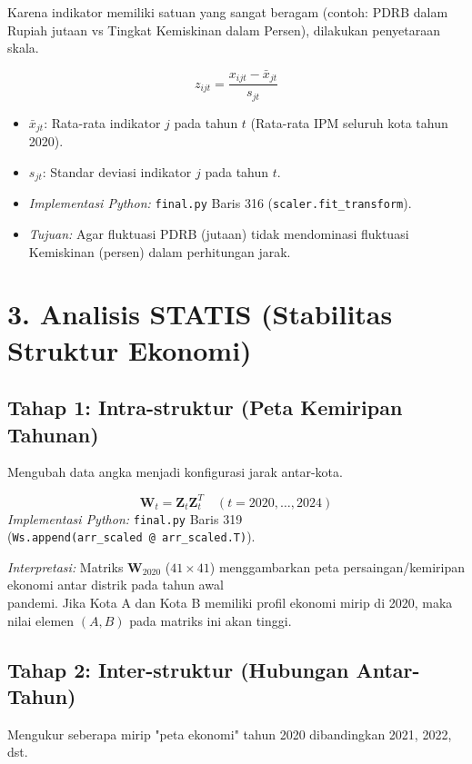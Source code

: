 Karena indikator memiliki satuan yang sangat beragam (contoh: PDRB dalam Rupiah jutaan vs Tingkat Kemiskinan dalam Persen), dilakukan penyetaraan skala.

\begin{equation}
    z_{ijt} = \frac{x_{ijt} - \bar{x}_{jt}}{s_{jt}}
\end{equation}

\begin{itemize}
    \item $\bar{x}_{jt}$: Rata-rata indikator $j$ pada tahun $t$ (Rata-rata IPM seluruh kota tahun 2020).
    \item $s_{jt}$: Standar deviasi indikator $j$ pada tahun $t$.
    \item \textit{Implementasi Python:} \texttt{final.py} Baris 316 (\texttt{scaler.fit\_transform}).
    \item \textit{Tujuan:} Agar fluktuasi PDRB (jutaan) tidak mendominasi fluktuasi Kemiskinan (persen) dalam perhitungan jarak.
\end{itemize}

\section*{3. Analisis STATIS (Stabilitas Struktur Ekonomi)}

\subsection*{Tahap 1: Intra-struktur (Peta Kemiripan Tahunan)}
Mengubah data angka menjadi konfigurasi jarak antar-kota.

\begin{equation}
    \mathbf{W}_t = \mathbf{Z}_t \mathbf{Z}_t^T \quad (t=2020, \dots, 2024)
\end{equation}
\textit{Implementasi Python:} \texttt{final.py} Baris 319 \\ (\texttt{Ws.append(arr\_scaled @ arr\_scaled.T)}).

\textit{Interpretasi:} Matriks $\mathbf{W}_{2020}$ ($41 \times 41$) menggambarkan peta persaingan/kemiripan ekonomi antar distrik pada tahun awal \\ pandemi. Jika Kota A dan Kota B memiliki profil ekonomi mirip di 2020, maka nilai elemen $(A,B)$ pada matriks ini akan tinggi.






\subsection*{Tahap 2: Inter-struktur (Hubungan Antar-Tahun)}
Mengukur seberapa mirip "peta ekonomi" tahun 2020 dibandingkan 2021, 2022, dst.

